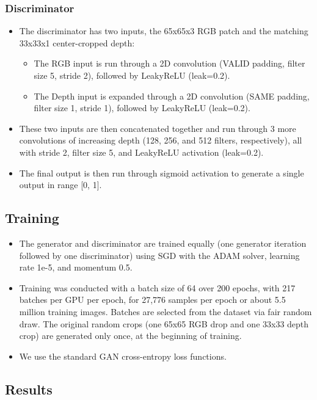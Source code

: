 \documentclass{article}
\begin{document}
\begin{flushleft}
  \subsubsection{Discriminator}
  \begin{itemize}
  \item The discriminator has two inputs, the 65x65x3 RGB patch and the matching 33x33x1 center-cropped depth:
    \begin{itemize}
    \item The RGB input is run through a 2D convolution (VALID padding, filter size 5, stride 2), followed by LeakyReLU (leak=0.2).
    \item The Depth input is expanded through a 2D convolution (SAME padding, filter size 1, stride 1), followed by LeakyReLU (leak=0.2).
    \end{itemize}
  \item These two inputs are then concatenated together and run through 3 more convolutions of increasing depth (128, 256, and 512 filters, respectively), all with stride 2, filter size 5, and LeakyReLU activation (leak=0.2).
  \item The final output is then run through sigmoid activation to generate a single output in range [0, 1].
  \end{itemize}

  \subsection{Training}

  \begin{itemize}
  \item The generator and discriminator are trained equally (one generator iteration followed by one discriminator) using SGD with the ADAM solver, learning rate 1e-5, and momentum 0.5.
  \item Training was conducted with a batch size of 64 over 200 epochs, with 217 batches per GPU per epoch, for 27,776 samples per epoch or about 5.5 million training images. Batches are selected from the dataset via fair random draw. The original random crops (one 65x65 RGB drop and one 33x33 depth crop) are generated only once, at the beginning of training.
  \item We use the standard GAN cross-entropy loss functions. 
  \end{itemize}

  \subsection{Results}



\end{flushleft}
\end{document}
